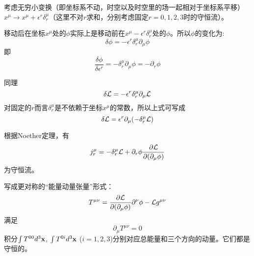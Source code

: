\documentclass[CJK]{beamer}
\begin{document}
\begin{frame}
\bch
考虑无穷小变换（即坐标系不动，时空以及时空里的场一起相对于坐标系平移）$x^\mu \rightarrow x^\mu + \epsilon^r \delta_r^\mu$（这里不对$r$求和，分别考虑固定$r=0,1,2,3$时的守恒流）。

移动后在坐标$x^\mu$处的$\phi$实际上是移动前在$x^\mu - \epsilon^r \delta_r^\mu$处的$\phi$。所以$\phi$的变化为:
$$\delta\phi = - \epsilon^r \delta_r^\mu \partial_\mu\phi$$
即
$$\frac{\delta\phi}{\delta\epsilon^r} = -\delta_r^\mu \partial_\mu \phi = -\partial_r\phi$$

\skipline

同理
$$\delta{\mathcal{L}} = - \epsilon^r \delta_r^\mu \partial_\mu{\mathcal{L}}$$
对固定的$r$而言$ \delta_r^\mu$是不依赖于坐标$x^\mu$的常数，所以上式可写成
$$\delta{\mathcal{L}} =\epsilon^r \partial_\mu (-  \delta_r^\mu {\mathcal{L}})$$

\ech
\end{frame}

\begin{frame}
\bch
根据Noether定理，有
$$j^\mu_r = - \delta_r^\mu {\mathcal{L}} +  \partial_r \phi\frac{\partial {\mathcal{L}}}{\partial (\partial_\mu \phi)}$$
为守恒流。

写成更对称的“能量动量张量”形式：
$$T^{\mu\nu} = \frac{\partial {\mathcal{L}}}{\partial (\partial_\mu \phi)}\partial^\nu\phi- {\mathcal{L}} g^{\mu\nu}$$
满足
$$\partial_\mu T^{\mu\nu} = 0$$
积分$\int T^{00} d^3{\mathbf{x}}$, $\int T^{0i}d^3{\mathbf{x}}$ ($i=1,2,3$)分别对应总能量和三个方向的动量。它们都是守恒的。
\ech
\end{frame}
\end{document}
